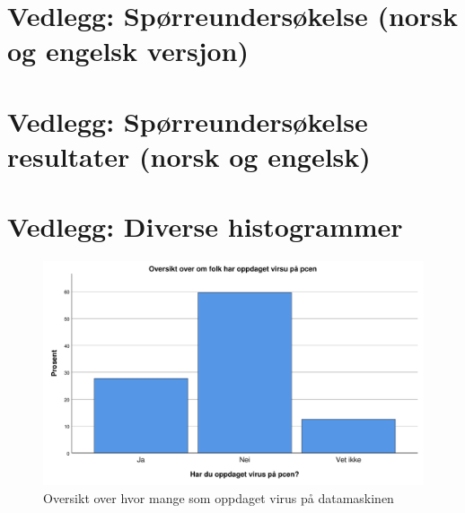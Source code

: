 \chapter{Vedlegg: Spørreundersøkelse (norsk og engelsk versjon)}

\label{undersokelse_norsk}


\label{undersokelse_engelsk}

\chapter{Vedlegg: Spørreundersøkelse resultater (norsk og engelsk)}

\label{undersokelse_norsk_resultater}


\label{undersokelse_engelsk_resultater}

\chapter{Vedlegg: Diverse histogrammer}
\begin{figure}[H]
    \centering
    \includegraphics[scale=0.5]{case_2/bilder/spss/oppdaget_virus.pdf}
    \caption[oppdaget-virus]{Oversikt over hvor mange som oppdaget virus på datamaskinen}
    \label{fig:oppdaget-virus}
\end{figure}

